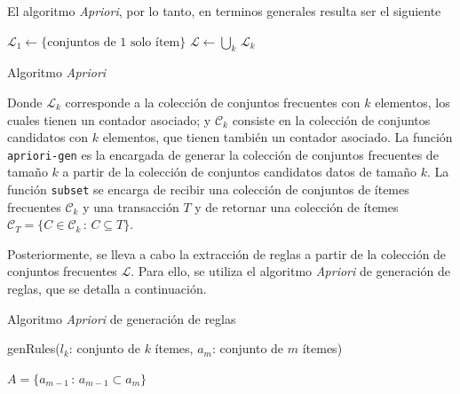 El algoritmo \textit{Apriori}, por lo tanto, en terminos generales resulta ser el siguiente

\begin{algorithm}[H]
\DontPrintSemicolon
{}
$\mathcal{L}_1 \leftarrow \{\text{conjuntos de 1 solo ítem}\}$\;
$\mathcal{L} \leftarrow \bigcup_k \, \mathcal{L}_k$\;
\caption{Algoritmo \textit{Apriori}}
\end{algorithm}

Donde $\mathcal{L}_k$ corresponde a la colección de conjuntos frecuentes con $k$ elementos, los cuales tienen un contador asociado; y $\mathcal{C}_k$ consiste en la colección de conjuntos candidatos con $k$ elementos, que tienen también un contador asociado. La función \texttt{apriori-gen} es la encargada de generar la colección de conjuntos frecuentes de tamaño $k$ a partir de la colección de conjuntos candidatos datos de tamaño $k$. La función \texttt{subset} se encarga de recibir una colección de conjuntos de ítemes frecuentes $\mathcal{C}_k$ y una transacción $T$ y de retornar una colección de ítemes $\mathcal{C}_T = \{C \in \mathcal{C}_k \, : \, C \subseteq T\}$.

Posteriormente, se lleva a cabo la extracción de reglas a partir de la colección de conjuntos frecuentes $\mathcal{L}$. Para ello, se utiliza el algoritmo \textit{Apriori} de generación de reglas, que se detalla a continuación.

\begin{algorithm}[H]
\DontPrintSemicolon
{}
\caption{Algoritmo \textit{Apriori} de generación de reglas}
\end{algorithm}

\begin{procedure}[H]
\DontPrintSemicolon
{}
\caption{genRules($l_k$: conjunto de $k$ ítemes, $a_m$: conjunto de $m$ ítemes)}
$A = \{a_{m-1} \, : \, a_{m-1} \subset a_m\}$\;
\end{procedure}

